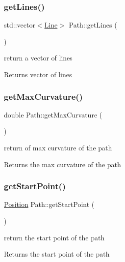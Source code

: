 \subsubsection{\texorpdfstring{get\+Lines()}{getLines()}}
{\footnotesize\ttfamily std\+::vector$<$\mbox{\hyperlink{class_line}{Line}}$>$ Path\+::get\+Lines (\begin{DoxyParamCaption}{ }\end{DoxyParamCaption})}



return a vector of lines 

\begin{DoxyReturn}{Returns}
vector of lines 
\end{DoxyReturn}
\mbox{\label{class_path_a613552d171c766462f422593b4957ecc}} 
\subsubsection{\texorpdfstring{get\+Max\+Curvature()}{getMaxCurvature()}}
{\footnotesize\ttfamily double Path\+::get\+Max\+Curvature (\begin{DoxyParamCaption}{ }\end{DoxyParamCaption})}



return of max curvature of the path 

\begin{DoxyReturn}{Returns}
the max curvature of the path 
\end{DoxyReturn}
\mbox{\label{class_path_a88e537e6bfe6140d00b0f36ca642a4cd}} 
\subsubsection{\texorpdfstring{get\+Start\+Point()}{getStartPoint()}}
{\footnotesize\ttfamily \mbox{\hyperlink{class_position}{Position}} Path\+::get\+Start\+Point (\begin{DoxyParamCaption}{ }\end{DoxyParamCaption})}



return the start point of the path 

\begin{DoxyReturn}{Returns}
the start point of the path 
\end{DoxyReturn}
\mbox{\label{class_path_a168f515818fd9b26a6264fdf95af52e8}} 
